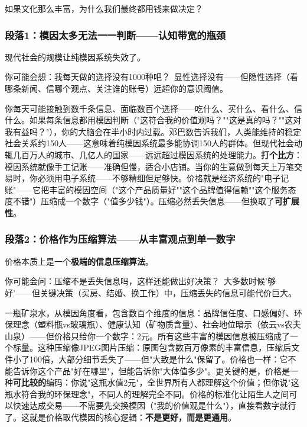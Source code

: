 \documentclass[../main.tex]{subfiles}
\begin{document}
	\begin{questionbox}

		如果文化那么丰富，为什么我们最终都用钱来做决定？

	\end{questionbox}

	\subsubsection*{段落1：模因太多无法一一判断——认知带宽的瓶颈}

	现代社会的规模让纯模因系统失效了。

	\begin{tcolorbox}[colback=yellow!5, title=\textit{读者行为预测}]

		你可能会想：我每天做的选择没有1000种吧？\ 显性选择没有——但隐性选择（看哪条新闻、信哪个观点、关注谁的账号）远超你的意识阈值。

	\end{tcolorbox}

你每天可能接触到数千条信息、面临数百个选择——吃什么、买什么、看什么、信什么。如果每条信息都用模因判断（"这符合我的价值观吗？""这是真的吗？""这对我有益吗？"），你的大脑会在半小时内过载。邓巴数告诉我们，人类能维持的稳定社会关系约150人——这意味着纯模因系统最多能协调150人的群体。但现代社会动辄几百万人的城市、几亿人的国家——远远超过模因系统的处理能力。\textbf{打个比方}：模因系统就像手工记账——准确但慢，适合小店铺。当你的生意做到每天上万笔交易时，你必须用电子系统——不够精细但足够快。价格就是经济系统的"电子记账"——它把丰富的模因空间（"这个产品质量好""这个品牌值得信赖""这个服务态度不错"）压缩成一个数字（"值多少钱"）。压缩必然丢失信息——但换取了\textbf{可扩展性}。

	\subsubsection*{段落2：价格作为压缩算法——从丰富观点到单一数字}

	价格本质上是一个\textbf{极端的信息压缩算法}。

	\begin{tcolorbox}[colback=yellow!5, title=\textit{读者行为预测}]

		你可能会问：压缩不是丢失信息吗，这样还能做出好决策？\ 大多数时候'够好'——但关键决策（买房、结婚、换工作）中，压缩丢失的信息可能代价巨大。

	\end{tcolorbox}

一瓶矿泉水，从模因角度看，包含数百个维度的信息：品牌信任度、口感偏好、环保理念（塑料瓶vs玻璃瓶）、健康认知（矿物质含量）、社会地位暗示（依云vs农夫山泉）——但价格只给你一个数字：2元。所有这些丰富的模因信息被压缩成了一个标量。这种压缩像JPEG图片压缩：原图包含数百万像素的丰富信息，压缩后文件小了100倍，大部分细节丢失了——但"大致是什么"保留了。价格也一样：它不能告诉你这个产品"好在哪里"，但能告诉你"大体值多少"。更关键的是，价格是一种\textbf{可比较的}编码：你说"这瓶水值2元"，全世界所有人都理解这个价值；但你说"这瓶水符合我的环保理念"，不同人的理解完全不同。价格的标准化让陌生人之间可以快速达成交易——不需要先交换模因（"我的价值观是什么"），直接看数字就行了。这就是价格取代模因的核心逻辑：\textbf{不是更好，而是更通用}。
\end{document}
